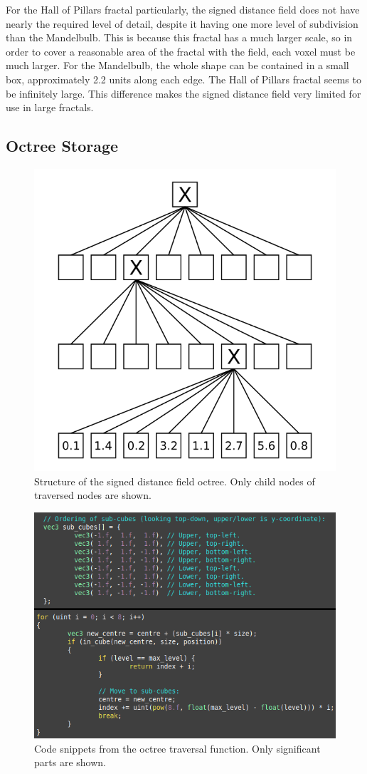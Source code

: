 For the Hall of Pillars fractal particularly, the signed distance field does not have nearly the required level of detail, despite it having one more level of subdivision than the Mandelbulb. This is because this fractal has a much larger scale, so in order to cover a reasonable area of the fractal with the field, each voxel must be much larger. For the Mandelbulb, the whole shape can be contained in a small box, approximately 2.2 units along each edge. The Hall of Pillars fractal seems to be infinitely large. This difference makes the signed distance field very limited for use in large fractals.

\subsection{Octree Storage}

\begin{figure}[ht]
	\centering
	\includegraphics[width=0.45\linewidth, frame]{Images/Octree-Structure.png}
	\caption{Structure of the signed distance field octree. Only child nodes of traversed nodes are shown.}
	\label{figure:octree-structure}
\end{figure}

\begin{figure}[ht]
	\centering
	\includegraphics[width=0.65\linewidth, frame]{Images/Octree-Traversal.png}
	\caption{Code snippets from the octree traversal function. Only significant parts are shown.}
	\label{figure:octree-traversal}
\end{figure}

